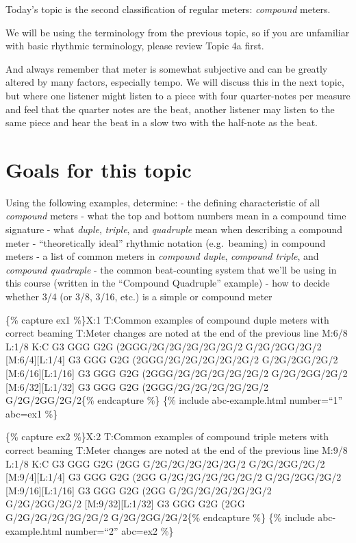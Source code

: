 \documentclass{book}
\begin{document}
Today's topic is the second classification of regular meters: \emph{compound}
meters.

We will be using the terminology from the previous topic, so if you are
unfamiliar with basic rhythmic terminology, please review Topic 4a first.

And always remember that meter is somewhat subjective and can be greatly
altered by many factors, especially tempo. We will discuss this in the next
topic, but where one listener might listen to a piece with four quarter-notes
per measure and feel that the quarter notes are the beat, another listener may
listen to the same piece and hear the beat in a slow two with the half-note as
the beat.

\hypertarget{goals-for-this-topic-7}{%
\section{Goals for this topic}\label{goals-for-this-topic-7}}

Using the following examples, determine: - the defining characteristic of all
\emph{compound} meters - what the top and bottom numbers mean in a compound
time signature - what \emph{duple}, \emph{triple}, and \emph{quadruple} mean
when describing a compound meter - ``theoretically ideal'' rhythmic notation
(e.g.~beaming) in compound meters - a list of common meters in \emph{compound
duple}, \emph{compound triple}, and \emph{compound quadruple} - the common
beat-counting system that we'll be using in this course (written in the
``Compound Quadruple'' example) - how to decide whether 3/4 (or 3/8, 3/16,
etc.) is a simple or compound meter

\{\% capture ex1 \%\}X:1 T:Common examples of compound duple meters with
correct beaming T:Meter changes are noted at the end of the previous line
M:6/8 L:1/8 K:C G3 GGG \textbar{} G2G (2GG\textbar G/2G/2G/2G/2G/2G/2
G/2G/2GG/2G/2\textbar\textbar{} {[}M:6/4{]}{[}L:1/4{]} G3 GGG \textbar{} G2G
(2GG\textbar G/2G/2G/2G/2G/2G/2 G/2G/2GG/2G/2\textbar\textbar{}
{[}M:6/16{]}{[}L:1/16{]} G3 GGG \textbar{} G2G (2GG\textbar G/2G/2G/2G/2G/2G/2
G/2G/2GG/2G/2\textbar\textbar{} {[}M:6/32{]}{[}L:1/32{]} G3 GGG \textbar{} G2G
(2GG\textbar G/2G/2G/2G/2G/2G/2 G/2G/2GG/2G/2\textbar\textbar\{\% endcapture
\%\} \{\% include abc-example.html number=``1'' abc=ex1 \%\}

\{\% capture ex2 \%\}X:2 T:Common examples of compound triple meters with
correct beaming T:Meter changes are noted at the end of the previous line
M:9/8 L:1/8 K:C G3 GGG G2G\textbar{} (2GG G/2G/2G/2G/2G/2G/2
G/2G/2GG/2G/2\textbar\textbar{} {[}M:9/4{]}{[}L:1/4{]} G3 GGG G2G\textbar{}
(2GG G/2G/2G/2G/2G/2G/2 G/2G/2GG/2G/2\textbar\textbar{}
{[}M:9/16{]}{[}L:1/16{]} G3 GGG G2G\textbar{} (2GG G/2G/2G/2G/2G/2G/2
G/2G/2GG/2G/2\textbar\textbar{} {[}M:9/32{]}{[}L:1/32{]} G3 GGG G2G\textbar{}
(2GG G/2G/2G/2G/2G/2G/2 G/2G/2GG/2G/2\textbar\textbar\{\% endcapture \%\} \{\%
include abc-example.html number=``2'' abc=ex2 \%\}
\end{document}
